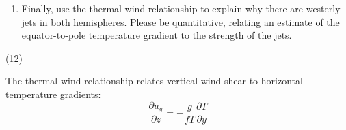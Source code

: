 \documentclass[letterpaper, 11pt]{article}
\newcommand{\1}{\mathds{1}}	%
\theoremstyle{definition}
\begin{document}
\begin{enumerate}[resume]
Let me recalculate:
\[
|v|_{\max} = \frac{2 \times 10^4 \times 3 \times 10^4}{1.2 \times 7.27 \times 10^{-5} \times 9 \times 10^8 \times \sqrt{2}} \cdot e^{-1/2}
\]
\[
= \frac{6 \times 10^8}{7.85 \times 10^4 \times 1.414} \times 0.606 \approx \frac{6 \times 10^8}{1.11 \times 10^5} \times 0.606 \approx 3275 \text{ m/s}
\]

This is $\boxed{\approx 3300 \text{ m/s}}$, which is absurdly fast (Mach 10)!

\textbf{(c)} Rossby number with $U \approx 3300$ m/s, $L = l = 3 \times 10^4$ m:
\[
Ro = \frac{U}{fL} = \frac{3300}{7.27 \times 10^{-5} \times 3 \times 10^4} = \frac{3300}{2.18} \approx \boxed{1500}
\]

$Ro \gg 1$, so geostrophic balance is NOT valid!

\textbf{(d)} Using cyclostrophic balance:
\[
\frac{u^2}{r} = -\frac{1}{\rho}\frac{\partial p}{\partial r}
\]

With $p(r) = 10^5 - 10^4 e^{-r^2/l^2}$:
\[
\frac{\partial p}{\partial r} = 10^4 \cdot \frac{2r}{l^2} e^{-r^2/l^2}
\]
\[
u^2 = -\frac{r}{\rho} \cdot \frac{\partial p}{\partial r} = \frac{2 \times 10^4 r^2}{\rho l^2} e^{-r^2/l^2}
\]
\[
u = \sqrt{\frac{2 \times 10^4}{\rho l^2}} \cdot r \cdot e^{-r^2/(2l^2)}
\]

Maximum at $\frac{d}{dr}(r e^{-r^2/(2l^2)}) = 0$: $r = l$.
\[
u_{\max} = \sqrt{\frac{2 \times 10^4}{1.2 \times (3 \times 10^4)^2}} \cdot l \cdot e^{-1/2}
\]
\[
= \sqrt{\frac{2 \times 10^4}{1.08 \times 10^9}} \times 3 \times 10^4 \times 0.606
\]
\[
= \sqrt{1.85 \times 10^{-5}} \times 1.82 \times 10^4 = 4.3 \times 10^{-3} \times 1.82 \times 10^4 \approx \boxed{78 \text{ m/s}}
\]

This is about 175 mph—a Category 5 hurricane!

\textbf{(e)} Rossby number with $U = 78$ m/s, $L = 3 \times 10^4$ m:
\[
Ro = \frac{78}{7.27 \times 10^{-5} \times 3 \times 10^4} = \frac{78}{2.18} \approx \boxed{36}
\]

Since $Ro \gg 1$, cyclostrophic balance is appropriate, not geostrophic balance.
\item Finally, use the thermal wind relationship to explain why there are westerly jets in both hemispheres. Please be quantitative, relating an estimate of the equator-to-pole temperature gradient to the strength of the jets.

\end{enumerate}
(12)

The thermal wind relationship relates vertical wind shear to horizontal temperature gradients:
\[
\frac{\partial u_g}{\partial z} = -\frac{g}{fT}\frac{\partial T}{\partial y}
\]
\end{document}
